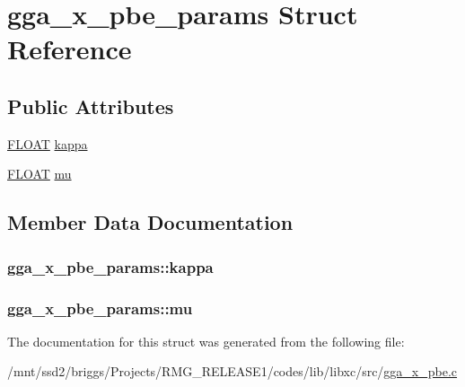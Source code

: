 \hypertarget{structgga__x__pbe__params}{\section{gga\-\_\-x\-\_\-pbe\-\_\-params Struct Reference}
\label{structgga__x__pbe__params}
}
\subsection*{Public Attributes}
\begin{DoxyCompactItemize}
\item 
\hyperlink{src_2xc__config_8h_ae8690abbffa85934d64d545920e2b108}{F\-L\-O\-A\-T} \hyperlink{structgga__x__pbe__params_ab52638b0b3d313737abe4cb030e12270}{kappa}
\item 
\hyperlink{src_2xc__config_8h_ae8690abbffa85934d64d545920e2b108}{F\-L\-O\-A\-T} \hyperlink{structgga__x__pbe__params_ae25e241821ea84e6a8f428e788c80233}{mu}
\end{DoxyCompactItemize}


\subsection{Member Data Documentation}
\hypertarget{structgga__x__pbe__params_ab52638b0b3d313737abe4cb030e12270}{
\subsubsection[{kappa}]{ gga\-\_\-x\-\_\-pbe\-\_\-params\-::kappa}}\label{structgga__x__pbe__params_ab52638b0b3d313737abe4cb030e12270}
\hypertarget{structgga__x__pbe__params_ae25e241821ea84e6a8f428e788c80233}{
\subsubsection[{mu}]{ gga\-\_\-x\-\_\-pbe\-\_\-params\-::mu}}\label{structgga__x__pbe__params_ae25e241821ea84e6a8f428e788c80233}


The documentation for this struct was generated from the following file\-:\begin{DoxyCompactItemize}
\item 
/mnt/ssd2/briggs/\-Projects/\-R\-M\-G\-\_\-\-R\-E\-L\-E\-A\-S\-E1/codes/lib/libxc/src/\hyperlink{gga__x__pbe_8c}{gga\-\_\-x\-\_\-pbe.\-c}\end{DoxyCompactItemize}
